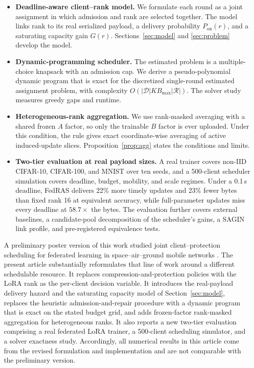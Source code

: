 \documentclass[preprint,12pt]{elsarticle}
\begin{document}
\begin{itemize}
\item \textbf{Deadline-aware client--rank model.} We formulate each round as a joint assignment in which admission and rank are selected together. The model links rank to its real serialized payload, a delivery probability $P_{\mathrm{on}}(r)$, and a saturating capacity gain $G(r)$. Sections~\ref{sec:model} and \ref{sec:problem} develop the model.
\item \textbf{Dynamic-programming scheduler.} The estimated problem is a multiple-choice knapsack with an admission cap. We derive a pseudo-polynomial dynamic program that is exact for the discretized single-round estimated assignment problem, with complexity $O(|\mathcal D| K B_{\max}|\mathcal R|)$. The solver study measures greedy gaps and runtime.
\item \textbf{Heterogeneous-rank aggregation.} We use rank-masked averaging with a shared frozen $A$ factor, so only the trainable $B$ factor is ever uploaded. Under this condition, the rule gives exact coordinate-wise averaging of active induced-update slices. Proposition~\ref{prop:agg} states the conditions and limits.
\item \textbf{Two-tier evaluation at real payload sizes.} A real trainer covers non-IID CIFAR-10, CIFAR-100, and MNIST over ten seeds, and a 500-client scheduler simulation covers deadline, budget, mobility, and scale regimes. Under a 0.1\,s deadline, FedRAS delivers 22\% more timely updates and 23\% fewer bytes than fixed rank 16 at equivalent accuracy, while full-parameter updates miss every deadline at $58.7\times$ the bytes. The evaluation further covers external baselines, a candidate-pool decomposition of the scheduler's gains, a SAGIN link profile, and pre-registered equivalence tests.
\end{itemize}

A preliminary poster version of this work studied joint client--protection scheduling for federated learning in space--air--ground mobile networks \cite{ma2026mswim}. The present article substantially reformulates that line of work around a different schedulable resource. It replaces compression-and-protection policies with the LoRA rank as the per-client decision variable. It introduces the real-payload delivery hazard and the saturating capacity model of Section~\ref{sec:model}, replaces the heuristic admission-and-repair procedure with a dynamic program that is exact on the stated budget grid, and adds frozen-factor rank-masked aggregation for heterogeneous ranks. It also reports a new two-tier evaluation comprising a real federated LoRA trainer, a 500-client scheduling simulator, and a solver exactness study. Accordingly, all numerical results in this article come from the revised formulation and implementation and are not comparable with the preliminary version.
\end{document}
